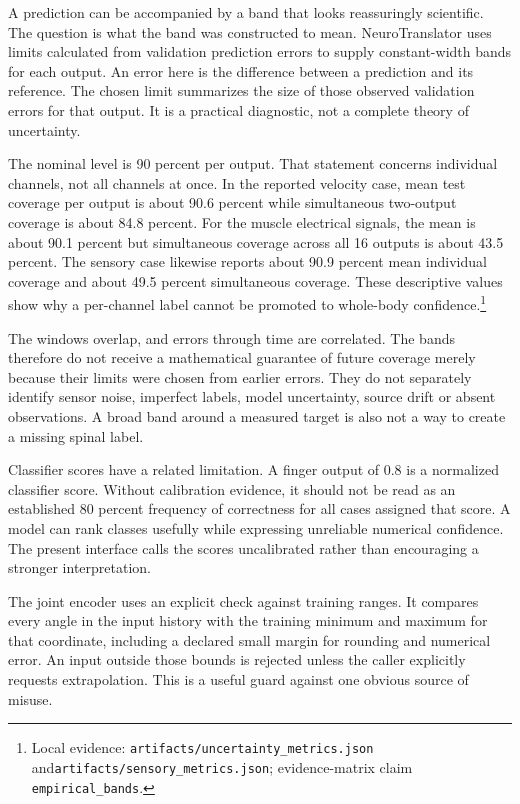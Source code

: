A prediction can be accompanied by a band that looks reassuringly scientific. The question is what the band was constructed to mean. NeuroTranslator uses limits calculated from validation prediction errors to supply constant-width bands for each output. An error here is the difference between a prediction and its reference. The chosen limit summarizes the size of those observed validation errors for that output. It is a practical diagnostic, not a complete theory of uncertainty.

The nominal level is 90 percent per output. That statement concerns individual channels, not all channels at once. In the reported velocity case, mean test coverage per output is about 90.6 percent while simultaneous two-output coverage is about 84.8 percent. For the muscle electrical signals, the mean is about 90.1 percent but simultaneous coverage across all 16 outputs is about 43.5 percent. The sensory case likewise reports about 90.9 percent mean individual coverage and about 49.5 percent simultaneous coverage. These descriptive values show why a per-channel label cannot be promoted to whole-body confidence.\footnote{Local evidence: \texttt{artifacts/uncertainty\_metrics.json} and\linebreak[4]
\texttt{artifacts/sensory\_metrics.json}; evidence-matrix claim \texttt{empirical\_bands}.}

The windows overlap, and errors through time are correlated. The bands therefore do not receive a mathematical guarantee of future coverage merely because their limits were chosen from earlier errors. They do not separately identify sensor noise, imperfect labels, model uncertainty, source drift or absent observations. A broad band around a measured target is also not a way to create a missing spinal label.

Classifier scores have a related limitation. A finger output of 0.8 is a normalized classifier score. Without calibration evidence, it should not be read as an established 80 percent frequency of correctness for all cases assigned that score. A model can rank classes usefully while expressing unreliable numerical confidence. The present interface calls the scores uncalibrated rather than encouraging a stronger interpretation.

The joint encoder uses an explicit check against training ranges. It compares every angle in the input history with the training minimum and maximum for that coordinate, including a declared small margin for rounding and numerical error. An input outside those bounds is rejected unless the caller explicitly requests extrapolation. This is a useful guard against one obvious source of misuse.

